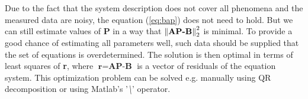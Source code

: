 Due to the fact that the system description does not cover all phenomena and the measured data are noisy, the equation (\ref{eq:bap}) does not need to hold. But we can still estimate values of \textbf{P} in a way that $\left\lVert\textbf{AP-B}\right\rVert_2^2$ is minimal. To provide a good chance of estimating all parameters well, such data should be supplied that the set of equations is overdetermined. The solution is then optimal in terms of least squares of \textbf{r}, where $\textbf{r} = \textbf{AP-B}$ is a vector of residuals of the equation system. This optimization problem can be solved e.g. manually using QR decomposition or using Matlab's '\textit{\textbackslash}' operator.